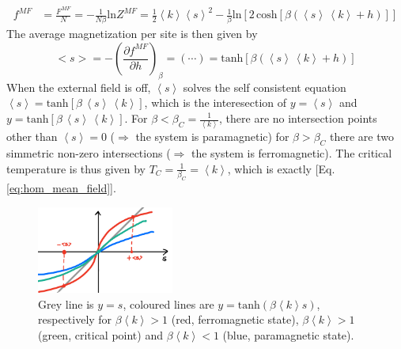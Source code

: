 {\begin{align*}
   f^{MF}&= \frac{F^{MF}}{N} = - \frac{1}{N\beta}\text{ln}Z^{MF} = \frac{1}{2}\left\langle k \right \rangle\left\langle s \right \rangle^2 -\frac{1}{\beta}\text{ln}\left[2\,\text{cosh}[\beta(\left\langle s \right \rangle\,\left\langle k \right \rangle+h)]\right]
\end{align*}
The average magnetization per site is then given by
\begin{equation*}
    <s> = -\left(\frac{\partial f^{MF}}{\partial h}\right)_\beta = (\cdots) = \text{tanh}[\beta(\left \langle s\right \rangle \, \left \langle k \right \rangle+h)]
\end{equation*}
When the external field is off, $\left\langle s\right\rangle$ solves the self consistent equation $\left\langle s\right\rangle = \text{tanh}[\beta\,\left\langle s\right\rangle\,\left\langle k\right\rangle]$, which is the interesection of $y = \left\langle s\right\rangle$ and $y = \text{tanh}[\beta\,\left\langle s\right\rangle\,\left\langle k\right\rangle]$.
For $\beta < \beta_C = \frac{1}{\left\langle k\right\rangle}$, there are no intersection points other than $\left\langle s \right \rangle = 0$  ($\Rightarrow$ the system is paramagnetic) for $\beta > \beta_C$ there are two simmetric non-zero intersections ($\Rightarrow$ the system is ferromagnetic). The critical temperature is thus given by $T_C = \frac{1}{\beta_C} = \left\langle k \right\rangle$, which is exactly [Eq. \ref{eq:hom_mean_field}].
\begin{figure}[H]
    \centering
    \includegraphics[width = 0.4\textwidth]{latex_source/images/ising/IMG_56FE6CFC861B-1.jpeg}
    \caption{\small Grey line is $y=s$, coloured lines are $y = \text{tanh}(\beta \left\langle k\right\rangle s)$, respectively for $\beta \left\langle k\right\rangle  > 1$ (red, ferromagnetic state), $\beta \left\langle k\right\rangle > 1$ (green, critical point) and $\beta \left\langle k\right\rangle < 1$ (blue, paramagnetic state).}
\end{figure}
}
